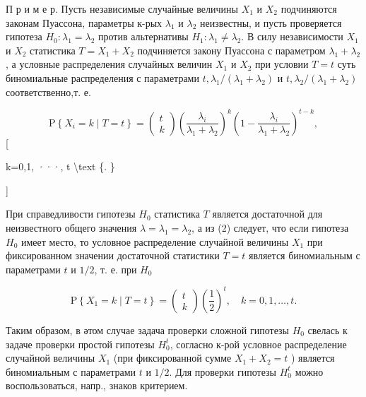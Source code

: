 \documentclass[10pt]{article}
\begin{document}
П р и м е р. Пусть независимые случайные величины $X_{1}$ и $X_{2}$ подчиняются законам Пуассона, параметры к-рых $\lambda_{1}$ и $\lambda_{2}$ неизвестны, и пусть проверяется гипотеза $H_{0}: \lambda_{1}=\lambda_{2}$ против альтернативы $H_{1}: \lambda_{1} \neq \lambda_{2}$. В силу независимости $X_{1}$ и $X_{2}$ статистика $T=X_{1}+X_{2}$ подчиняется закону Пуассона с параметром $\lambda_{1}+\lambda_{2}$, а условные распределения случайных величин $X_{1}$ и $X_{2}$ при условии $T=t$ суть биномиальные распределения с параметрами $t, \lambda_{1} /\left(\lambda_{1}+\lambda_{2}\right)$ и $t, \lambda_{2} /\left(\lambda_{1}+\lambda_{2}\right)$ соответственно,т. е.



\[

\mathrm{P}\left\{X_{i}=k \mid T=t\right\}=\left(\begin{array}{l}

t \\

k

\end{array}\right)\left(\frac{\lambda_{i}}{\lambda_{1}+\lambda_{2}}\right)^{k}\left(1-\frac{\lambda_{i}}{\lambda_{1}+\lambda_{2}}\right)^{t-k},

\][



k=0,1, ···, t \textbackslash text \{. \}

]



При справедливости гипотезы $H_{0}$ статистика $T$ является достаточной для неизвестного общего значения $\lambda=\lambda_{1}=\lambda_{2}$, а из (2) следует, что если гипотеза $H_{0}$ имеет место, то условное распределение случайной величины $X_{1}$ при фиксированном значении достаточной статистики $T=t$ является биномиальным с параметрами $t$ и $1 / 2$, т. е. при $H_{0}$



\[

\mathrm{P}\left\{X_{1}=k \mid T=t\right\}=\left(\begin{array}{l}

t \\

k

\end{array}\right)\left(\frac{1}{2}\right)^{t}, \quad k=0,1, \ldots, t .

\]



Таким образом, в әтом случае задача проверки сложной гипотезы $H_{0}$ свелась к задаче проверки простой гипотезы $H_{0}^{t}$, согласно к-рой условное распределение случайной величины $X_{1}$ (при фиксированной сумме $X_{1}+X_{2}=t$ ) является биномиальным с параметрами $t$ и $1 / 2$. Для проверки гипотезы $H_{0}^{t}$ можно воспользоваться, напр., знаков критерием.
\end{document}
